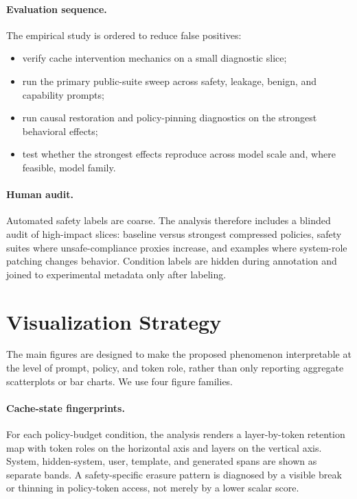 \documentclass[11pt]{article}
\begin{document}
\paragraph{Evaluation sequence.}
The empirical study is ordered to reduce false positives:
\begin{itemize}
  \item verify cache intervention mechanics on a small diagnostic slice;
  \item run the primary public-suite sweep across safety, leakage, benign, and capability prompts;
  \item run causal restoration and policy-pinning diagnostics on the strongest behavioral effects;
  \item test whether the strongest effects reproduce across model scale and, where feasible, model family.
\end{itemize}

\paragraph{Human audit.}
Automated safety labels are coarse. The analysis therefore includes a blinded audit of high-impact slices: baseline versus strongest compressed policies, safety suites where unsafe-compliance proxies increase, and examples where system-role patching changes behavior. Condition labels are hidden during annotation and joined to experimental metadata only after labeling.

\section{Visualization Strategy}

The main figures are designed to make the proposed phenomenon interpretable at the level of prompt, policy, and token role, rather than only reporting aggregate scatterplots or bar charts. We use four figure families.

\paragraph{Cache-state fingerprints.}
For each policy-budget condition, the analysis renders a layer-by-token retention map with token roles on the horizontal axis and layers on the vertical axis. System, hidden-system, user, template, and generated spans are shown as separate bands. A safety-specific erasure pattern is diagnosed by a visible break or thinning in policy-token access, not merely by a lower scalar score.
\end{document}
